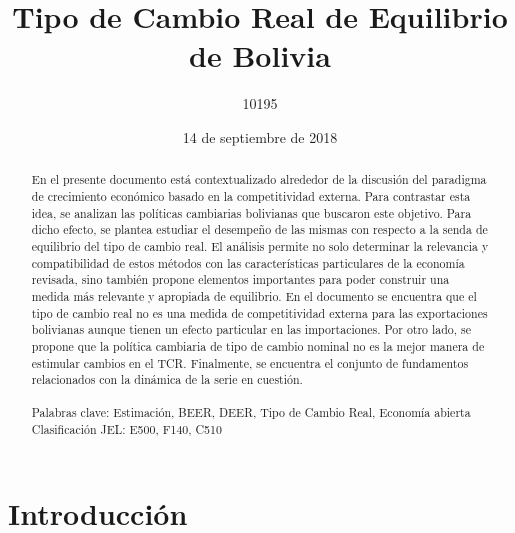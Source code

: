 \documentclass[12pt,letterpaper]{article}
\title{Tipo de Cambio Real de Equilibrio de Bolivia}
\author{10195}
\date{14 de septiembre de 2018}
\begin{document}
 

\maketitle 

\begin{abstract}
\singlespacing

En el presente documento está contextualizado alrededor de la discusión del paradigma de crecimiento económico basado en la competitividad externa. Para contrastar esta idea, se analizan las políticas cambiarias bolivianas que buscaron este objetivo. Para dicho efecto, se plantea estudiar el desempeño de las mismas con respecto a la senda de equilibrio del tipo de cambio real. El análisis permite no solo determinar la relevancia y compatibilidad de estos métodos con las características particulares de la economía revisada, sino también propone elementos importantes para poder construir una medida más relevante y apropiada de equilibrio. En el documento se encuentra que el tipo de cambio real no es una medida de competitividad externa para las exportaciones bolivianas aunque tienen un efecto particular en las importaciones. Por otro lado, se propone que la política cambiaria de tipo de cambio nominal no es la mejor manera de estimular cambios en el TCR. Finalmente, se encuentra el conjunto de fundamentos relacionados con la dinámica de la serie en cuestión.
\\
\\
\bigskip
Palabras clave: Estimación, BEER, DEER, Tipo de Cambio Real, Economía abierta \\
Clasificación JEL: E500, F140, C510

\end{abstract}

\newpage

\section{Introducción}

\end{document}
